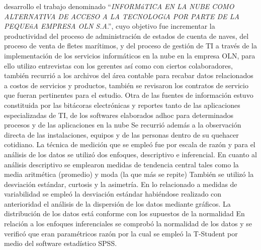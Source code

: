 \cite{jcampos} desarrollo el trabajo denominado ``\emph{INFORMáTICA EN LA NUBE
COMO ALTERNATIVA DE ACCESO A LA TECNOLOGíA POR PARTE DE LA PEQUEñA EMPRESA
OLN S.A}.'', cuyo objetivo fue incrementar la productividad del proceso de
administración de estados de cuenta de naves, del proceso de venta de fletes
marítimos, y del proceso de gestión de TI a través de la implementación
de los servicios informáticos en la nube en la empresa OLN, para ello utilizo
entrevistas con los gerentes así como con ciertos colaboradores, también recurrió
a los archivos del área contable para recabar datos relacionados a costos de
servicios y productos, también se revisaron los contratos de servicio que fueran
pertinentes para el estudio. Otra de las fuentes de información estuvo constituida
por las bitácoras electrónicas y reportes tanto de las aplicaciones especializadas de
TI, de los softwares elaborados adhoc para determinados procesos y de las aplicaciones en la nube
Se recurrió además a la observación directa de las instalaciones, equipos y de las personas
dentro de su quehacer cotidiano. La técnica de medición que se empleó fue por escala de
razón y para el análisis de los datos se utilizó dos enfoques, descriptivo e inferencial.
En cuanto al análisis descriptivo se emplearon medidas de tendencia central tales como
la media aritmética (promedio) y moda (la que más se repite) También se utilizó la
desviación estándar, curtosis y la asimetría.
En lo relacionado a medidas de variabilidad se empleó la desviación estándar habiéndose
realizado con anterioridad el análisis de la dispersión de los datos mediante gráficos.
La distribución de los datos está conforme con los supuestos de la normalidad
En relación a los enfoques inferenciales se comprobó la normalidad de los datos y se
verificó que eran paramétricos razón por la cual se empleó la T-Student por medio del
software estadístico SPSS.

